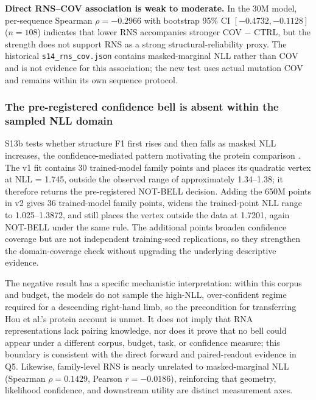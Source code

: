 \textbf{Direct RNS--COV association is weak to moderate.} In the 30M model, per-sequence Spearman \(\rho=-0.2966\) with bootstrap 95\% CI \([-0.4732,-0.1128]\) (\(n=108\)) indicates that lower RNS accompanies stronger COV \(-\) CTRL, but the strength does not support RNS as a strong structural-reliability proxy. The historical \texttt{s14\_rns\_cov.json} contains masked-marginal NLL rather than COV and is not evidence for this association; the new test uses actual mutation COV and remains within its own sequence protocol.

\hypertarget{the-pre-registered-confidence-bell-is-absent-within-the-sampled-nll-domain}{%
\subsubsection{The pre-registered confidence bell is absent within the sampled NLL domain}\label{the-pre-registered-confidence-bell-is-absent-within-the-sampled-nll-domain}}

S13b tests whether structure F1 first rises and then falls as masked NLL increases, the confidence-mediated pattern motivating the protein comparison \citep{hou_scaling}. The v1 fit contains 30 trained-model family points and places its quadratic vertex at NLL = 1.745, outside the observed range of approximately 1.34--1.38; it therefore returns the pre-registered NOT-BELL decision. Adding the 650M points in v2 gives 36 trained-model family points, widens the trained-point NLL range to 1.025--1.3872, and still places the vertex outside the data at 1.7201, again NOT-BELL under the same rule. The additional points broaden confidence coverage but are not independent training-seed replications, so they strengthen the domain-coverage check without upgrading the underlying descriptive evidence.

The negative result has a specific mechanistic interpretation: within this corpus and budget, the models do not sample the high-NLL, over-confident regime required for a descending right-hand limb, so the precondition for transferring Hou et al.'s protein account is unmet. It does not imply that RNA representations lack pairing knowledge, nor does it prove that no bell could appear under a different corpus, budget, task, or confidence measure; this boundary is consistent with the direct forward and paired-readout evidence in Q5. Likewise, family-level RNS is nearly unrelated to masked-marginal NLL (Spearman \(\rho=0.1429\), Pearson \(r=-0.0186\)), reinforcing that geometry, likelihood confidence, and downstream utility are distinct measurement axes.

